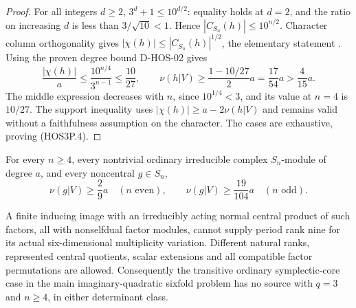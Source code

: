 \begin{proof}
For all integers $d\ge2$, $3^d+1\le10^{d/2}$: equality holds
at $d=2$, and the ratio on increasing $d$ is less than
$3/\sqrt{10}<1$. Hence $|C_{S_n}(h)|\le10^{n/2}$.
Character column orthogonality gives
$|\chi(h)|\le|C_{S_n}(h)|^{1/2}$, the elementary statement
\cite[Lemma~4.3.1, p.~1912]{HOS:LST2011}.
Using the proven degree bound D-HOS-02 gives
\[
 \frac{|\chi(h)|}{a}
       \le\frac{10^{n/4}}{3^{n-1}}\le\frac{10}{27},
 \qquad
       \nu(h|V)\ge\frac{1-10/27}{2}a
                         =\frac{17}{54}a>\frac4{15}a.       \tag{HOS3P.9}
\]
The middle expression decreases with $n$, since $10^{1/4}<3$,
and its value at $n=4$ is $10/27$. The support inequality uses
$|\chi(h)|\ge a-2\nu(h|V)$ and remains valid without a
faithfulness assumption on the character. The cases are
exhaustive, proving (HOS3P.4).
\end{proof}

\begin{theorem}
\label{D-HOS-22}
For every $n\ge4$, every nontrivial ordinary irreducible complex
$S_n$-module of degree $a$, and every noncentral $g\in S_n$,
\[
 \nu(g|V)\ge\frac29a\quad(n\text{ even}),\qquad
 \nu(g|V)\ge\frac{19}{104}a\quad(n\text{ odd}).               \tag{HOS3P.10}
\]

A finite inducing image with an irreducibly acting normal central
product of such factors, all with nonselfdual factor modules,
cannot supply period rank nine for its actual six-dimensional
multiplicity variation. Different natural ranks, represented
central quotients, scalar extensions and all compatible factor
permutations are allowed. Consequently the transitive ordinary
symplectic-core case in the main imaginary-quadratic sixfold
problem has no source with $q=3$ and $n\ge4$, in either
determinant class.
\end{theorem}

